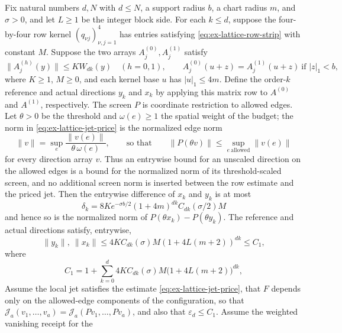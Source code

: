 \begin{proposition}
\label{prop:ex-lattice-strip-to-probe}
Fix natural numbers \(d,N\) with \(d\le N\), a support radius \(b\), a
chart radius \(m\), and \(\sigma>0\), and let \(L\ge1\) be the integer
block side. For each
\(k\le d\), suppose the four-by-four row kernel
\((q_{\nu j})_{\nu,j=1}^4\) has entries satisfying \eqref{eq:ex-lattice-row-strip} with constant
\(M\). Suppose the two arrays \(A^{(0)}_j,A^{(1)}_j\) satisfy
\begin{equation}
 \|A^{(h)}_j(y)\|\le K W_{dk}(y)\quad(h=0,1),
 \qquad
 A^{(0)}_j(u+z)=A^{(1)}_j(u+z)\ \text{if }|z|_1<b,
 \label{eq:ex-lattice-local-array-input}
\end{equation}
where \(K\ge1\), \(M\ge0\), and each kernel base \(u\) has
\(|u|_1\le4m\). Define the order-\(k\) reference and actual directions \(y_k\) and
\(x_k\) by
applying this matrix row to \(A^{(0)}\) and \(A^{(1)}\), respectively.
The screen \(P\) is coordinate restriction to allowed edges. Let
\(\theta>0\) be the threshold and \(\omega(e)\ge1\) the spatial weight of
the budget; the norm in \eqref{eq:ex-lattice-jet-price} is the normalized edge norm
\[
 \|v\|=\sup_{e}\frac{\|v(e)\|}{\theta\,\omega(e)},
 \qquad\text{so that}\qquad
 \|P(\theta v)\|\le\sup_{e\ \mathrm{allowed}}\|v(e)\|
\]
for every direction array \(v\). Thus an entrywise bound for an unscaled
direction on the allowed edges is a bound for the normalized norm of its
threshold-scaled screen, and no additional screen norm is inserted
between the row estimate and the priced jet. Then the entrywise
difference of \(x_k\) and \(y_k\) is at most
\begin{equation}
 \delta_k=
  8K e^{-\sigma b/2}(1+4m)^{dk}C_{dk}(\sigma/2)M
 \label{eq:ex-lattice-local-delta}
\end{equation}
and hence so is the normalized norm of \(P(\theta x_k)-P(\theta y_k)\).
The reference and actual directions satisfy, entrywise,
\[
 \|y_k\|,\ \|x_k\|
 \le 4K C_{dk}(\sigma)M(1+4L(m+2))^{dk}\le C_1,
\]
where
\begin{equation}
 C_1=1+\sum_{k=0}^{d}
 4K C_{dk}(\sigma)M\bigl(1+4L(m+2)\bigr)^{dk},
 \label{eq:ex-lattice-local-C1}
\end{equation}
Assume the local jet satisfies the estimate \eqref{eq:ex-lattice-jet-price}, that \(F\) depends
only on the allowed-edge components of the configuration, so that
\(\mathcal J_a(v_1,\ldots,v_a)=\mathcal J_a(Pv_1,\ldots,Pv_a)\), and also
that
\(\varepsilon_d\le C_1\). Assume the weighted vanishing receipt for the

\end{proposition}

